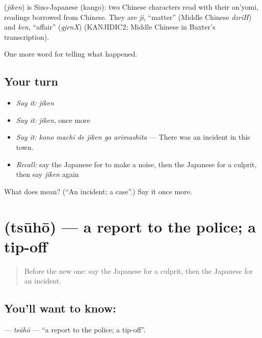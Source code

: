 \begin{cousinweb}
\textbf{} (\emph{jiken}) is Sino-Japanese (kango): two Chinese characters read with their on'yomi, readings borrowed from Chinese. They are \emph{ji}, \textquotedblleft{}matter\textquotedblright{} (Middle Chinese \emph{dzriH}) and \emph{ken}, \textquotedblleft{}affair\textquotedblright{} (\emph{gjenX}) (KANJIDIC2; Middle Chinese in Baxter's transcription).
\end{cousinweb}

\begin{grammarlens}[title={What you've built}]
One more word for telling what happened.
\end{grammarlens}

\subsection*{Your turn}
\begin{itemize}
\raggedright
  \item \emph{Say it:} \emph{jiken}
  \item \emph{Say it:} \emph{jiken}, once more
  \item \emph{Say it:} \emph{kono machi de jiken ga arimashita} — There was an incident in this town.
  \item \emph{Recall:} say the Japanese for to make a noise, then the Japanese for a culprit, then say \emph{jiken} again
\end{itemize}

\begin{tcolorbox}[breakable,colback=teal!4,colframe=teal!35!black,title={Before you move on}]
What does  mean? (\textquotedblleft{}An incident; a case\textquotedblright{}.) Say it once more.
\end{tcolorbox}
\section[\texorpdfstring{\ja{つうほう} (tsūhō)}{つうほう (tsūhō)}]{ (tsūhō) — a report to the police; a tip-off}

\label{lesson:JA-C270-tsuuhou}



\begin{quote}
Before the new one: say the Japanese for a culprit, then the Japanese for an incident.
\end{quote}

\subsection*{You'll want to know: }
\textbf{} — \emph{tsūhō} — \textquotedblleft{}a report to the police; a tip-off\textquotedblright{}.

